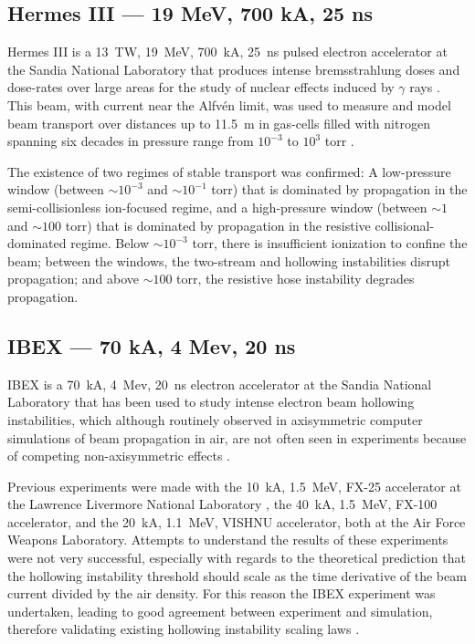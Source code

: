 \documentclass [12pt,a4paper,     ]{report} %
\begin{document}
\subsection{Hermes III --- 19 MeV, 700 kA, 25 ns}

Hermes III is a 13~TW, 19~MeV, 700~kA, 25~ns pulsed electron accelerator at the Sandia National Laboratory that produces intense bremsstrahlung doses and dose-rates over large areas for the study of nuclear effects induced by $\gamma$ rays \cite{SANFO1992A,SANFO1992B}.  This beam, with current near the Alfv\'en limit, was used to measure and model beam transport over distances up to 11.5~m in gas-cells filled with nitrogen spanning six decades in pressure range from $10^{-3}$ to $10^{3}$ torr \cite{SANFO1993,SANFO1994,SANFO1995}.

  The existence of two regimes of stable transport was confirmed: A low-pressure window (between $\sim 10^{-3}$ and $\sim 10^{-1}$ torr) that is dominated by propagation in the semi-collisionless ion-focused regime, and a high-pressure window (between $\sim 1$ and $\sim 100$ torr) that is dominated by propagation in the resistive collisional-dominated regime.  Below $\sim 10^{-3}$ torr, there is insufficient ionization to confine the beam; between the windows, the two-stream and hollowing instabilities disrupt propagation; and above $\sim 100$ torr, the resistive hose instability degrades propagation.




\subsection{IBEX --- 70 kA, 4 Mev, 20 ns}

IBEX is a 70~kA, 4~Mev, 20~ns electron accelerator at the Sandia National Laboratory that has been used to study intense electron beam hollowing instabilities, which although routinely observed in axisymmetric computer simulations of beam propagation in air, are not often seen in experiments because of competing non-axisymmetric effects \cite{EKDAH1985-, GODFR1987-}. 

   Previous experiments were made with the 10~kA, 1.5~MeV, FX-25 accelerator at the Lawrence Livermore National Laboratory \cite{LAUER1978-,JOYCE1983-}, the 40~kA, 1.5~MeV, FX-100 accelerator, and the 20~kA, 1.1~MeV, VISHNU accelerator, both at the Air Force Weapons Laboratory. Attempts to understand the results of these experiments were not very successful, especially with regards to the theoretical prediction that the hollowing instability threshold should scale as the time derivative of the beam current divided by the air density.  For this reason the IBEX experiment was undertaken, leading to good agreement between experiment and simulation, therefore validating existing hollowing instability scaling laws \cite{JOYCE1983-,EKDAH1985-, GODFR1987-}.
\end{document}
